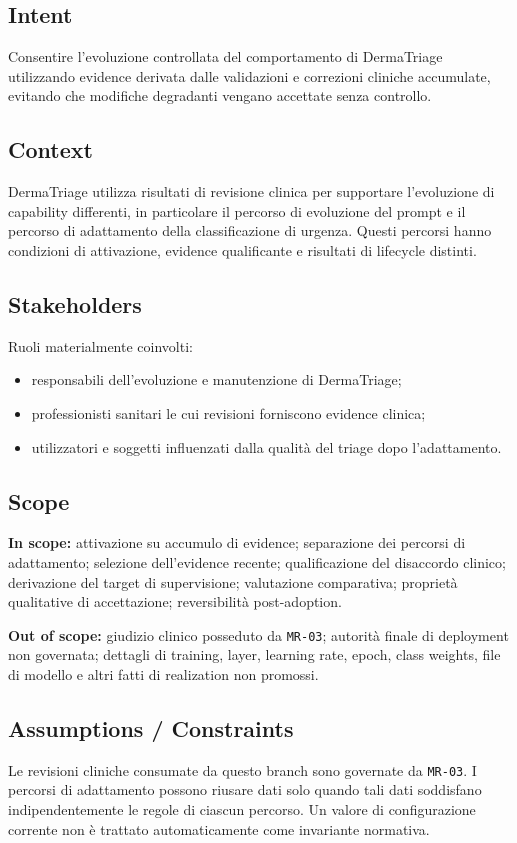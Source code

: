 \documentclass[11pt,a4paper]{article}
\begin{document}
\subsection{Intent}
Consentire l'evoluzione controllata del comportamento di DermaTriage utilizzando evidence derivata dalle validazioni e correzioni cliniche accumulate, evitando che modifiche degradanti vengano accettate senza controllo.

\subsection{Context}
DermaTriage utilizza risultati di revisione clinica per supportare l'evoluzione di capability differenti, in particolare il percorso di evoluzione del prompt e il percorso di adattamento della classificazione di urgenza. Questi percorsi hanno condizioni di attivazione, evidence qualificante e risultati di lifecycle distinti.

\subsection{Stakeholders}
Ruoli materialmente coinvolti:
\begin{itemize}
\item responsabili dell'evoluzione e manutenzione di DermaTriage;
\item professionisti sanitari le cui revisioni forniscono evidence clinica;
\item utilizzatori e soggetti influenzati dalla qualità del triage dopo l'adattamento.
\end{itemize}

\subsection{Scope}
\textbf{In scope:} attivazione su accumulo di evidence; separazione dei percorsi di adattamento; selezione dell'evidence recente; qualificazione del disaccordo clinico; derivazione del target di supervisione; valutazione comparativa; proprietà qualitative di accettazione; reversibilità post-adoption.

\textbf{Out of scope:} giudizio clinico posseduto da \texttt{MR-03}; autorità finale di deployment non governata; dettagli di training, layer, learning rate, epoch, class weights, file di modello e altri fatti di realization non promossi.

\subsection{Assumptions / Constraints}
Le revisioni cliniche consumate da questo branch sono governate da \texttt{MR-03}. I percorsi di adattamento possono riusare dati solo quando tali dati soddisfano indipendentemente le regole di ciascun percorso. Un valore di configurazione corrente non è trattato automaticamente come invariante normativa.
\end{document}
